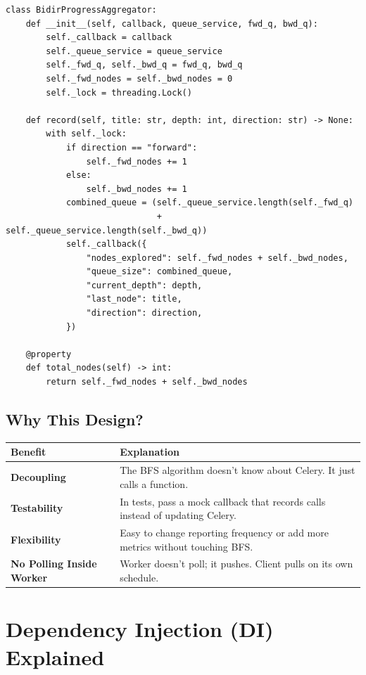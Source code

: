 \documentclass[11pt,a4paper]{article}
\begin{document}
\begin{lstlisting}[caption=pathfinding.py -- BidirProgressAggregator]
class BidirProgressAggregator:
    def __init__(self, callback, queue_service, fwd_q, bwd_q):
        self._callback = callback
        self._queue_service = queue_service
        self._fwd_q, self._bwd_q = fwd_q, bwd_q
        self._fwd_nodes = self._bwd_nodes = 0
        self._lock = threading.Lock()

    def record(self, title: str, depth: int, direction: str) -> None:
        with self._lock:
            if direction == "forward":
                self._fwd_nodes += 1
            else:
                self._bwd_nodes += 1
            combined_queue = (self._queue_service.length(self._fwd_q)
                              + self._queue_service.length(self._bwd_q))
            self._callback({
                "nodes_explored": self._fwd_nodes + self._bwd_nodes,
                "queue_size": combined_queue,
                "current_depth": depth,
                "last_node": title,
                "direction": direction,
            })

    @property
    def total_nodes(self) -> int:
        return self._fwd_nodes + self._bwd_nodes
\end{lstlisting}

\subsection{Why This Design?}

\begin{tabularx}{\textwidth}{@{}>{\bfseries}l X@{}}
\toprule
Benefit & Explanation \\
\midrule
Decoupling & The BFS algorithm doesn't know about Celery. It just calls a function. \\
\addlinespace[0.3em]
Testability & In tests, pass a mock callback that records calls instead of updating Celery. \\
\addlinespace[0.3em]
Flexibility & Easy to change reporting frequency or add more metrics without touching BFS. \\
\addlinespace[0.3em]
No Polling Inside Worker & Worker doesn't poll; it pushes. Client pulls on its own schedule. \\
\bottomrule
\end{tabularx}

\section{Dependency Injection (DI) Explained}
\end{document}

